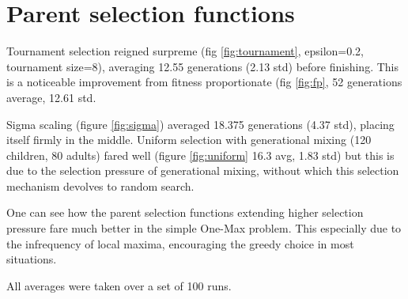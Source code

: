 \section{Parent selection functions}
Tournament selection reigned surpreme (fig \ref{fig:tournament}, epsilon=0.2, tournament size=8), averaging 12.55 generations (2.13 std) before finishing. This is a noticeable improvement from fitness proportionate (fig \ref{fig:fp}, 52 generations average, 12.61 std.

Sigma scaling (figure \ref{fig:sigma}) averaged 18.375 generations (4.37 std), placing itself firmly in the middle. Uniform selection with generational mixing (120 children, 80 adults) fared well (figure \ref{fig:uniform} 16.3 avg, 1.83 std) but this is due to the selection pressure of generational mixing, without which this selection mechanism devolves to random search.

One can see how the parent selection functions extending higher selection pressure fare much better in the simple One-Max problem. This especially due to the infrequency of local maxima, encouraging the greedy choice in most situations.

All averages were taken over a set of 100 runs.


